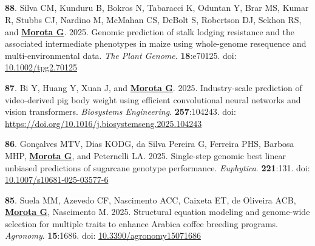 \documentclass[margin,line,10pt]{res}
\newenvironment{list1}{
  \begin{list}{\ding{113}}{%
      \setlength{\itemsep}{0in}
      \setlength{\parsep}{0in} \setlength{\parskip}{0in}
      \setlength{\topsep}{0in} \setlength{\partopsep}{0in} 
      \setlength{\leftmargin}{0.17in}}}{\end{list}}
\begin{document}
\begin{resume}
\section{}
\begin{list1}

  \item  [{\bf 88}.] Silva CM, Kunduru B, Bokros N, Tabaracci K, Oduntan Y, Brar MS, Kumar R, Stubbs CJ, Nardino M, McMahan CS, DeBolt S, Robertson DJ, Sekhon RS, and \textbf{\underline{Morota G}}. 2025. Genomic prediction of stalk lodging resistance and the associated intermediate phenotypes in maize using whole-genome resequence and multi-environmental data. \emph{The Plant Genome}. \textbf{18}:e70125. doi: \textcolor{blue}{\href{https://doi.org/10.1002/tpg2.70125}{10.1002/tpg2.70125}}

  \vspace{0.5cm}

  \item  [{\bf 87}.] Bi Y, Huang Y, Xuan J, and \textbf{\underline{Morota G}}. 2025. Industry-scale prediction of video-derived pig body weight using efficient convolutional neural networks and vision transformers. \emph{Biosystems Engineering}.  \textbf{257}:104243. doi: \textcolor{blue}{\href{https://doi.org/10.1016/j.biosystemseng.2025.104243}{https://doi.org/10.1016/j.biosystemseng.2025.104243}}

  \vspace{0.5cm}

  \item [{\bf 86}.] Gon\c{c}alves MTV, Dias KODG, da Silva Pereira G, Ferreira PHS, Barbosa MHP, \textbf{\underline{Morota G}}, and Peternelli LA. 2025. Single-step genomic best linear unbiased predictions of sugarcane genotype performance. \emph{Euphytica}. \textbf{221}:131. doi: \textcolor{blue}{\href{https://doi.org/10.1007/s10681-025-03577-6}{10.1007/s10681-025-03577-6}}

  \vspace{0.5cm}

  \item  [{\bf 85}.] Suela MM, Azevedo CF, Nascimento ACC, Caixeta ET, de Oliveira ACB, \textbf{\underline{Morota G}}, Nascimento M. 2025. Structural equation modeling and genome-wide selection for multiple traits to enhance Arabica coffee breeding programs. \emph{Agronomy}. \textbf{15}:1686. doi: \textcolor{blue}{\href{https://doi.org/10.3390/agronomy15071686}{10.3390/agronomy15071686}}


  \vspace{0.5cm}


\end{list1}
\end{resume}
\end{document}
